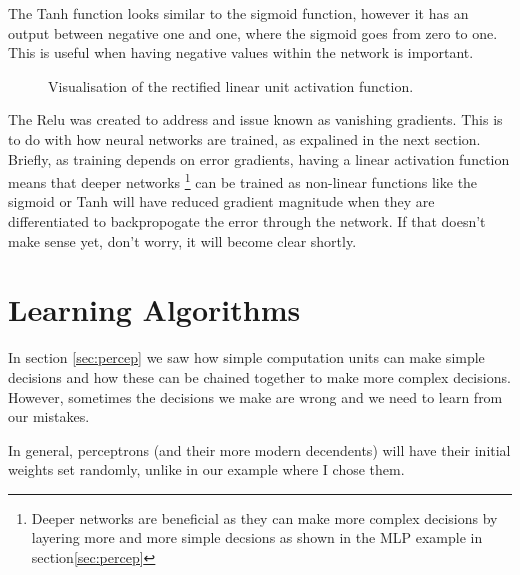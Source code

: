 The Tanh function looks similar to the sigmoid function, however it has an output between negative one and one, where the sigmoid goes from zero to one. This is useful when having negative values within the network is important.

\begin{figure}[h]
\begin{center}
\caption{Visualisation of the rectified linear unit activation function.}
\label{fig:activation_relu}
\end{center}
\end{figure}

The Relu was created to address and issue known as vanishing gradients. This is to do with how neural networks are trained, as expalined in the next section. Briefly, as training depends on error gradients, having a linear activation function means that deeper networks \footnote{Deeper networks are beneficial as they can make more complex decisions by layering more and more simple decsions as shown in the MLP example in section\ref{sec:percep}} can be trained as non-linear functions like the sigmoid or Tanh will have reduced gradient magnitude when they are differentiated to backpropogate the error through the network. If that doesn't make sense yet, don't worry, it will become clear shortly.

\section{Learning Algorithms}
In section \ref{sec:percep} we saw how simple computation units can make simple decisions and how these can be chained together to make more complex decisions. However, sometimes the decisions we make are wrong and we need to learn from our mistakes.

In general, perceptrons (and their more modern decendents) will have their initial weights set randomly, unlike in our example where I chose them. 

